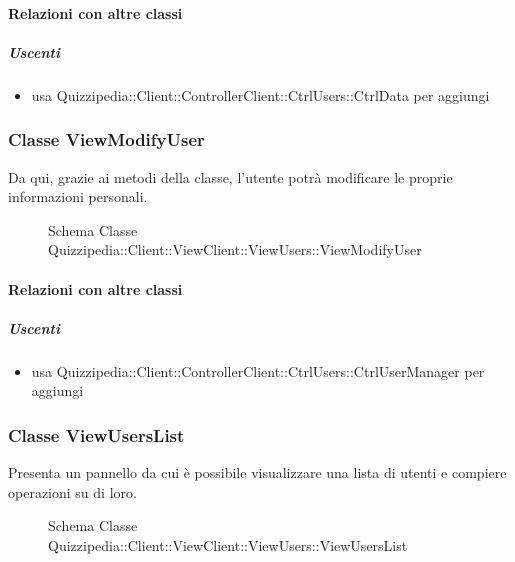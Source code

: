 \paragraph{Relazioni con altre classi}
\subparagraph{Uscenti}
\begin{itemize}
\item usa Quizzipedia::Client::ControllerClient::CtrlUsers::CtrlData per aggiungi
\end{itemize}
\subsubsection{Classe ViewModifyUser}
Da qui, grazie ai metodi della classe, l'utente potrà modificare le proprie informazioni personali.
\begin{figure}[H]
\centering
\noindent{}
\caption[Schema Classe ViewModifyUser]{Schema Classe Quizzipedia::Client::ViewClient::ViewUsers::ViewModifyUser}
\end{figure}
\paragraph{Relazioni con altre classi}
\subparagraph{Uscenti}
\begin{itemize}
\item usa Quizzipedia::Client::ControllerClient::CtrlUsers::CtrlUserManager per aggiungi
\end{itemize}
\subsubsection{Classe ViewUsersList}
Presenta un pannello da cui è possibile visualizzare una lista di utenti e compiere operazioni su di loro.
\begin{figure}[H]
\centering
\noindent{}
\caption[Schema Classe ViewUsersList]{Schema Classe Quizzipedia::Client::ViewClient::ViewUsers::ViewUsersList}
\end{figure}

